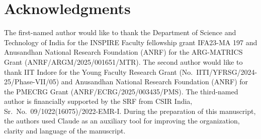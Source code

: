 \documentclass[11pt]{amsart}
\theoremstyle{definition}
\theoremstyle{remark}
\numberwithin{equation}{theorem}
\begin{document}
\section*{Acknowledgments}
The first-named author would like to thank the Department of Science and Technology of India for
the INSPIRE Faculty fellowship grant IFA23-MA 197 and Anusandhan National Research Foundation (ANRF)
for the ARG-MATRICS Grant (ANRF/ARGM/2025/001651/MTR). The second author would like to thank IIT
Indore for the Young Faculty Research Grant (No.\ IITI/YFRSG/2024-25/Phase-VII/05) and Anusandhan
National Research Foundation (ANRF) for the PMECRG Grant (ANRF/ECRG/2025/003435/PMS). The
third-named author is financially supported by the SRF from CSIR India, Sr.\ No.\
09/1022(16075)/2022-EMR-I. During the preparation of this manuscript, the authors used Claude as an auxiliary
tool  for improving the organization, clarity and language of
the manuscript.



\end{document}

